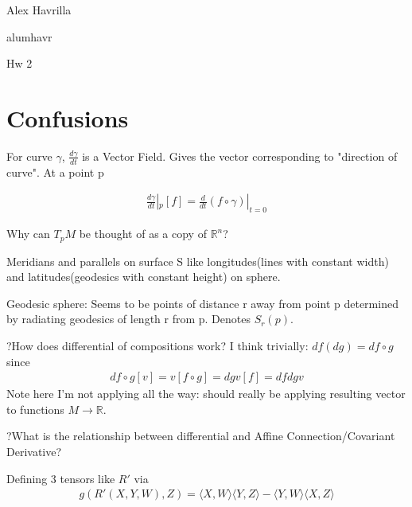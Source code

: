 \documentclass[11pt]{article}
\newcommand{\R}{\mathbb{R}}
\newcommand{\myname}{Alex Havrilla}
\newcommand{\myandrew}{alumhavr}
\newcommand{\myhwnum}{Hw 2}
\begin{document}
\newtheorem{prop}{Prop}
\newtheorem{lemma}{Lemma}
\newtheorem{remark}{Remark}
\newtheorem{defi}{Def}
\newtheorem{apps}{Application}
\newtheorem{quest}{Question}
\newtheorem{ans}{Answer}
\newtheorem{interest}{Interesting}
\newtheorem{theme}{Theme}
\newtheorem{theorem}{Theorem}
\newtheorem{example}{Example}


\medskip                        

\thispagestyle{plain}
\begin{center}

{\myname}

\myandrew

\myhwnum

\end{center}

\section{Confusions}

For curve $\gamma$, $\frac{d\gamma}{dt}$ is a Vector Field. Gives the vector corresponding to "direction of curve". At a point p

\begin{align*}
	\frac{d\gamma}{dt}|_p[f] = \frac{d}{dt}(f \circ \gamma) |_{t = 0}
\end{align*}

Why can $T_pM$ be thought of as a copy of $\R^n$?

Meridians and parallels on surface S like longitudes(lines with constant width) and latitudes(geodesics with constant height) on sphere.

Geodesic sphere: Seems to be points of distance r away from point p determined by radiating geodesics of length r from p. Denotes $S_r(p)$. 

?How does differential of compositions work?
I think trivially: $df(dg) = d f\circ g$ since
\begin{align*}
	d f\circ g[v] = v[f\circ g] = dg v[f] = df dg v
\end{align*}
Note here I'm not applying all the way: should really be applying resulting vector to functions $M \to \R$. 

?What is the relationship between differential and Affine Connection/Covariant Derivative?

Defining 3 tensors like $R'$ via 
\begin{align*}
	g(R'(X,Y,W),Z) = \langle X,W\rangle\langle Y , Z \rangle - \langle Y,W\rangle \langle X,Z \rangle
\end{align*}
\end{document}
